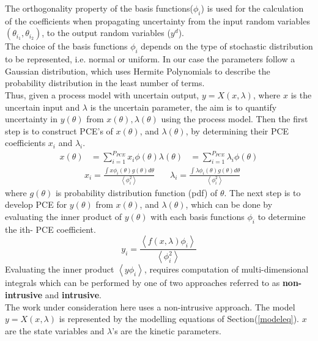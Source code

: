 \documentclass[3p,times]{elsarticle}
\begin{document}
The orthogonality property of the basis functions($\phi_{i}$) is used for the  calculation of the coefficients when propagating uncertainty from the input random variables$(\theta_{i_{1}}, \theta_{i_{2}})$, to the output random
variables ($y^{d}$).\\
The choice of the basis functions $\phi_{i}$ depends on the type of stochastic distribution to be represented, i.e. normal or uniform. In our case the parameters follow a Gaussian distribution\cite{yenkie}, which uses Hermite Polynomials to describe the probability distribution in the least number of terms.\\
Thus, given a process model with uncertain output, $y = X(x,\lambda)$, where $x$ is the uncertain input and $\lambda$ is the uncertain parameter, the aim is to quantify uncertainty in $y(\theta)$ from $x(\theta), \lambda(\theta)$ using the process model. Then the first step is to construct PCE’s of $x(\theta)$, and $\lambda(\theta)$, by determining their PCE coefficients $x_{i}$ and $\lambda_{i}$.
\begin{align}
x(\theta) &= \sum_{i=1}^{P_{PCE}} x_{i}\phi(\theta)
\lambda(\theta) &= \sum_{i=1}^{P_{PCE}} \lambda_{i}\phi(\theta)
\end{align}
\begin{align}
&x_{i} = \frac{\int x\phi_{i}(\theta)g(\theta) d\theta}{\left\langle \phi^{2}_{i}\right\rangle } \quad
&\lambda_{i} = \frac{\int \lambda\phi_{i}(\theta)g(\theta) d\theta}{\left\langle \phi^{2}_{i}\right\rangle }
\end{align}
where $g(\theta)$ is probability distribution function (pdf) of $\theta$. 
The next step is to develop PCE for $y(\theta)$ from  $x(\theta)$, and $\lambda(\theta)$, which can be done by evaluating the
inner product of $y(\theta)$ with each basis functions $\phi_{i}$ to determine the ith- PCE coefficient.
\begin{equation}
y_{i} = \frac{\left\langle f(x,\lambda)\phi_{i} \right\rangle }{\left\langle \phi^{2}_{i} \right\rangle }
\end{equation}
Evaluating the inner product $\left\langle y\phi_{i} \right\rangle $, requires computation of multi-dimensional integrals which can be performed by one of two approaches referred to as \textbf{non-intrusive} and \textbf{intrusive}.\\
The work under consideration here uses a non-intrusive approach. The model $y=X(x,\lambda)$ is represented by the modelling equations of Section(\ref{modeleq}). $x$ are the state variables and $\lambda$'s are the kinetic parameters.
\end{document}
